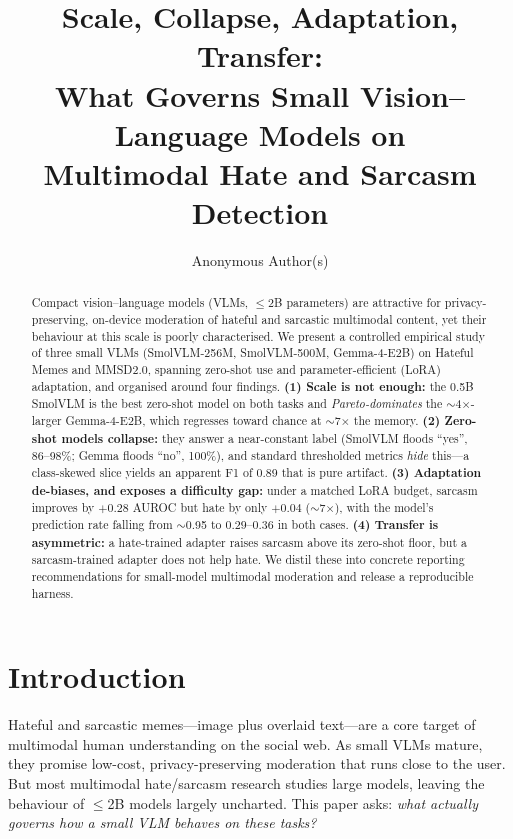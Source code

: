 \documentclass[sigconf,nonacm]{acmart}
\begin{document}
\title{Scale, Collapse, Adaptation, Transfer:\\
What Governs Small Vision--Language Models on\\
Multimodal Hate and Sarcasm Detection}

\author{Anonymous Author(s)}

\begin{abstract}
Compact vision--language models (VLMs, $\leq$2B parameters) are attractive for
privacy-preserving, on-device moderation of hateful and sarcastic multimodal content, yet
their behaviour at this scale is poorly characterised. We present a controlled empirical
study of three small VLMs (SmolVLM-256M, SmolVLM-500M, Gemma-4-E2B) on Hateful Memes and
MMSD2.0, spanning zero-shot use and parameter-efficient (LoRA) adaptation, and organised
around four findings. \textbf{(1) Scale is not enough:} the 0.5B SmolVLM is the best
zero-shot model on both tasks and \emph{Pareto-dominates} the $\sim$4$\times$-larger
Gemma-4-E2B, which regresses toward chance at $\sim$7$\times$ the memory.
\textbf{(2) Zero-shot models collapse:} they answer a near-constant label (SmolVLM floods
``yes'', 86--98\%; Gemma floods ``no'', 100\%), and standard thresholded metrics
\emph{hide} this---a class-skewed slice yields an apparent F1 of 0.89 that is pure
artifact. \textbf{(3) Adaptation de-biases, and exposes a difficulty gap:} under a matched
LoRA budget, sarcasm improves by $+0.28$ AUROC but hate by only $+0.04$ ($\sim$7$\times$),
with the model's prediction rate falling from $\sim$0.95 to $0.29$--$0.36$ in both cases.
\textbf{(4) Transfer is asymmetric:} a hate-trained adapter raises sarcasm above its
zero-shot floor, but a sarcasm-trained adapter does not help hate. We distil these into
concrete reporting recommendations for small-model multimodal moderation and release a
reproducible harness.
\end{abstract}


\maketitle

\section{Introduction}
Hateful and sarcastic memes---image plus overlaid text---are a core target of multimodal
human understanding on the social web. As small VLMs mature, they promise low-cost,
privacy-preserving moderation that runs close to the user. But most multimodal
hate/sarcasm research studies large models, leaving the behaviour of $\leq$2B models
largely uncharted. This paper asks: \emph{what actually governs how a small VLM behaves on
these tasks?}
\end{document}
